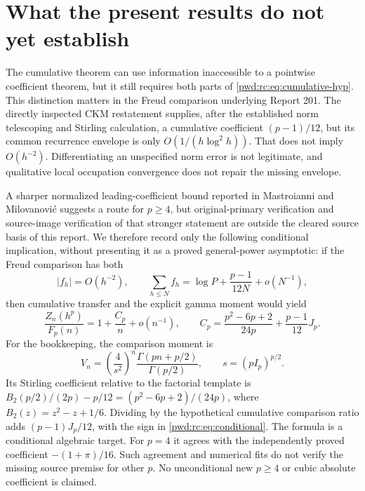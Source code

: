 \documentclass[11pt,letterpaper]{article}
\numberwithin{equation}{section}
\theoremstyle{remark}\newtheorem{remark}[theorem]{Remark}
\begin{document}
\section{What the present results do not yet establish}\label{pwd:rc:sec:limits}
The cumulative theorem can use information inaccessible to a pointwise coefficient theorem, but it still requires both parts of \eqref{pwd:rc:eq:cumulative-hyp}. This distinction matters in the Freud comparison underlying Report 201. The directly inspected CKM restatement \cite[Eq.~(2.3)]{ckm} supplies, after the established norm telescoping and Stirling calculation, a cumulative coefficient $(p-1)/12$, but its common recurrence envelope is only $O(1/(h\log^2h))$. That does not imply $O(h^{-2})$. Differentiating an unspecified norm error is not legitimate, and qualitative local occupation convergence does not repair the missing envelope.

A sharper normalized leading-coefficient bound reported in Mastroianni and Milovanovi\'c \cite[Theorem 2.4.10]{mastroianni} suggests a route for $p\ge4$, but original-primary verification and source-image verification of that stronger statement are outside the cleared source basis of this report. We therefore record only the following conditional implication, without presenting it as a proved general-power asymptotic: if the Freud comparison has both
\[
 |f_h|=O(h^{-2}),\qquad
 \sum_{h\le N}f_h=\log P+\frac{p-1}{12N}+o(N^{-1}),
\]
then cumulative transfer and the explicit gamma moment would yield
\begin{equation}\label{pwd:rc:eq:conditional}
 \frac{Z_n(h^p)}{F_p(n)}=1+\frac{C_p}{n}+o(n^{-1}),\qquad
 C_p=\frac{p^2-6p+2}{24p}+\frac{p-1}{12}J_p.
\end{equation}
For the bookkeeping, the comparison moment is
\[
 V_n=\left(\frac4{s^2}\right)^n\frac{\Gamma(pn+p/2)}{\Gamma(p/2)},
 \qquad s=(pI_p)^{p/2}.
\]
Its Stirling coefficient relative to the factorial template is
$B_2(p/2)/(2p)-p/12=(p^2-6p+2)/(24p)$, where $B_2(z)=z^2-z+1/6$.
Dividing by the hypothetical cumulative comparison ratio adds $(p-1)J_p/12$, with the sign in \eqref{pwd:rc:eq:conditional}. The formula is a conditional algebraic target. For $p=4$ it agrees with the independently proved coefficient $-(1+\pi)/16$. Such agreement and numerical fits do not verify the missing source premise for other $p$. No unconditional new $p\ge4$ or cubic absolute coefficient is claimed.
\end{document}

